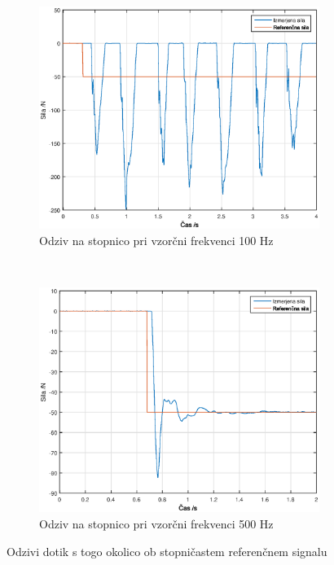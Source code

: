 \documentclass[a4paper]{article}
\begin{document}
\begin{figure}[!ht]
	
	   \begin{subfigure}[b]{0.4\textwidth}
	   	\includegraphics[width=\textwidth]{./slike/figure_0_hz_100dt.eps}

	   	\caption{Odziv na stopnico pri vzorčni frekvenci 100 Hz}
	   	\label{fig:0hzgraph100}
	   \end{subfigure}
	   ~ %
	   \begin{subfigure}[b]{0.4\textwidth}
	   	\includegraphics[width=\textwidth]{./slike/figure_0_hz_5.eps}
	   	\caption{Odziv na stopnico pri vzorčni frekvenci 500 Hz}
	   	\label{fig:0hzgraph500}
	   \end{subfigure}
	   	\caption{Odzivi dotik s togo okolico ob stopničastem referenčnem signalu}
	   	\label{fig:stepgraphs}
	
\end{figure}
\end{document}
